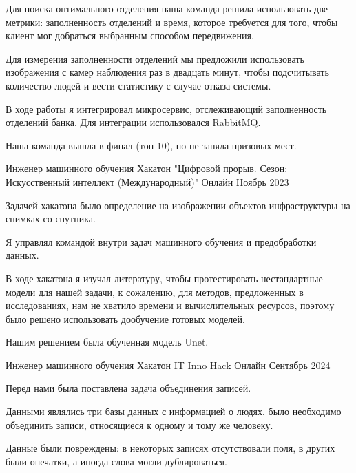 \begin{cventries}
{\begin{cvitems}
    \item {Для поиска оптимального отделения наша команда решила использовать две метрики: заполненность отделений и время, которое требуется для того, чтобы клиент мог добраться выбранным способом передвижения. }
    \item {Для измерения заполненности отделений мы предложили использовать изображения с камер наблюдения раз в двадцать минут, чтобы подсчитывать количество людей и вести статистику с случае отказа системы. }
    \item {В ходе работы я интегрировал микросервис, отслеживающий заполненность отделений банка. Для интеграции использовался RabbitMQ.}
    \item {Наша команда вышла в финал (топ-10), но не заняла призовых мест. }
  \end{cvitems}
}
\cventry
{Инженер машинного обучения} %
{Хакатон "Цифровой прорыв. Сезон: Искусственный интеллект (Международный)"} %
{Онлайн} %
{Ноябрь 2023} %
{
  \begin{cvitems} %
    \item {Задачей хакатона было определение на изображении объектов инфраструктуры на снимках со спутника. }
    \item {Я управлял командой внутри задач машинного обучения и предобработки данных. }
    \item {В ходе хакатона я изучал литературу, чтобы протестировать нестандартные модели для нашей задачи, к сожалению, для методов, предложенных в исследованиях, нам не хватило времени и вычислительных ресурсов, поэтому было решено использовать дообучение готовых моделей. }
    \item {Нашим решением была обученная модель Unet. } 
  \end{cvitems}
}
\cventry
{Инженер машинного обучения} %
{Хакатон IT Inno Hack} %
{Онлайн} %
{Сентябрь 2024} %
{
  \begin{cvitems} %
    \item {Перед нами была поставлена задача объединения записей. }
    \item {Данными являлись три базы данных с информацией о людях, было необходимо объединить записи, относящиеся к одному и тому же человеку. }
    \item {Данные были повреждены: в некоторых записях отсутствовали поля, в других были опечатки, а иногда слова могли дублироваться. }

\end{cvitems}}
\end{cventries}
